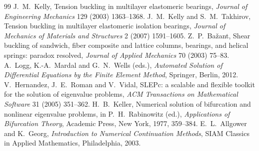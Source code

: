\begin{chapterbib}{99}
 J.~M.~Kelly, Tension buckling in multilayer elastomeric bearings, \emph{Journal of Engineering Mechanics} 129 (2003) 1363--1368.
 J.~M.~Kelly and S.~M.~Takhirov, Tension buckling in multilayer elastomeric isolation bearings, \emph{Journal of Mechanics of Materials and Structures} 2 (2007) 1591--1605.
 Z.~P.~Ba\v{z}ant, Shear buckling of sandwich, fiber composite and lattice columns, bearings, and helical springs: paradox resolved, \emph{Journal of Applied Mechanics} 70 (2003) 75--83.
 A.~Logg, K.-A.~Mardal and G.~N.~Wells (eds.), \emph{Automated Solution of Differential Equations by the Finite Element Method}, Springer, Berlin, 2012.
 V.~Hernandez, J.~E.~Roman and V.~Vidal, SLEPc: a scalable and flexible toolkit for the solution of eigenvalue problems, \emph{ACM Transactions on Mathematical Software} 31 (2005) 351--362.
 H.~B.~Keller, Numerical solution of bifurcation and nonlinear eigenvalue problems, in P.~H.~Rabinowitz (ed.), \emph{Applications of Bifurcation Theory}, Academic Press, New York, 1977, 359--384.
 E.~L.~Allgower and K.~Georg, \emph{Introduction to Numerical Continuation Methods}, SIAM Classics in Applied Mathematics, Philadelphia, 2003.
\end{chapterbib}
